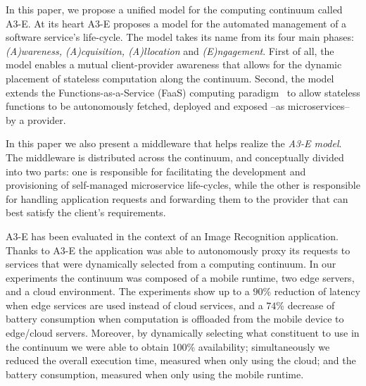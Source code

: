 In this paper, we propose a unified model for the computing continuum called A3-E. At its heart A3-E proposes a model for the automated management of a software service's life-cycle. The model takes its name from its four main phases: \textit{(A)wareness, (A)cquisition, (A)llocation} and \textit{(E)ngagement}. First of all, the model enables a mutual client-provider awareness that allows for the dynamic placement of stateless computation along the continuum. Second, the model extends the Functions-as-a-Service (FaaS) computing paradigm~\cite{Hendrickson:2016,baldini2017serverless,GarrigaMendonca2017} to allow stateless functions to be autonomously fetched, deployed and exposed --as microservices-- by a provider. 

In this paper we also present a middleware that helps realize the \textit{A3-E model}. The middleware is distributed across the continuum, and conceptually divided into two parts: one is responsible for facilitating the development and provisioning of self-managed microservice life-cycles, while the other is responsible for handling application requests and forwarding them to the provider that can best satisfy the client's requirements.



A3-E has been evaluated in the context of an Image Recognition application. Thanks to A3-E the application was able to autonomously proxy its requests to services that were dynamically selected from a computing continuum. In our experiments the continuum was composed of a mobile runtime, two edge servers, and a cloud environment. The experiments show up to a $90$\% reduction of latency when edge services are used instead of cloud services, and a $74$\% decrease of battery consumption when computation is offloaded from the mobile device to edge/cloud servers. Moreover, by dynamically selecting what constituent to use in the continuum we were able to obtain 100\% availability; simultaneously we reduced the overall execution time, measured when only using the cloud; and the battery consumption, measured when only using the mobile runtime.

